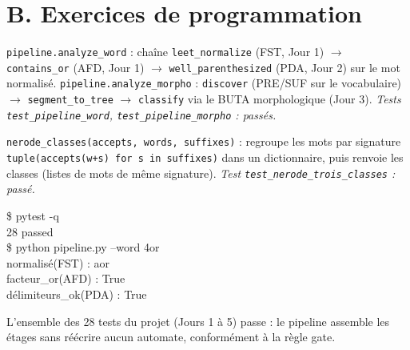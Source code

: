 \documentclass[11pt,a4paper]{scrartcl}
\begin{document}
\section*{B. Exercices de programmation}

\begin{description}[leftmargin=1.6em,style=nextline]
  \item[E5.1] \texttt{pipeline.analyze\_word} : chaîne
    \texttt{leet\_normalize} (FST, Jour 1) $\to$ \texttt{contains\_or} (AFD,
    Jour 1) $\to$ \texttt{well\_parenthesized} (PDA, Jour 2) sur le mot
    normalisé. \texttt{pipeline.analyze\_morpho} : \texttt{discover} (PRE/SUF
    sur le vocabulaire) $\to$ \texttt{segment\_to\_tree} $\to$
    \texttt{classify} via le BUTA morphologique (Jour 3). \emph{Tests
    \texttt{test\_pipeline\_word}, \texttt{test\_pipeline\_morpho} : passés.}
  \item[E5.3] \texttt{nerode\_classes(accepts, words, suffixes)} : regroupe
    les mots par signature \texttt{tuple(accepts(w+s) for s in suffixes)}
    dans un dictionnaire, puis renvoie les classes (listes de mots de même
    signature). \emph{Test \texttt{test\_nerode\_trois\_classes} : passé.}
\end{description}

\begin{exemple}
\ttfamily
\$ pytest -q\\
28 passed\\[4pt]
\$ python pipeline.py --word 4or\\
normalisé(FST) : aor\\
facteur\_or(AFD) : True\\
délimiteurs\_ok(PDA) : True
\end{exemple}

\noindent L'ensemble des 28 tests du projet (Jours 1 à 5) passe : le pipeline
assemble les étages sans réécrire aucun automate, conformément à la règle
gate.
\end{document}
